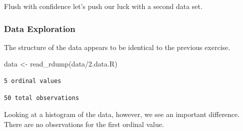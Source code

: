 \documentclass[
  letterpaper,
  DIV=11,
  numbers=noendperiod]{scrartcl}
\newenvironment{Shaded}{\begin{snugshade}}{\end{snugshade}}
\newcommand{\AttributeTok}[1]{\textcolor[rgb]{0.40,0.45,0.13}{#1}}
\newcommand{\DecValTok}[1]{\textcolor[rgb]{0.68,0.00,0.00}{#1}}
\newcommand{\FloatTok}[1]{\textcolor[rgb]{0.68,0.00,0.00}{#1}}
\newcommand{\FunctionTok}[1]{\textcolor[rgb]{0.28,0.35,0.67}{#1}}
\newcommand{\NormalTok}[1]{\textcolor[rgb]{0.00,0.23,0.31}{#1}}
\newcommand{\OtherTok}[1]{\textcolor[rgb]{0.00,0.23,0.31}{#1}}
\newcommand{\SpecialCharTok}[1]{\textcolor[rgb]{0.37,0.37,0.37}{#1}}
\newcommand{\StringTok}[1]{\textcolor[rgb]{0.13,0.47,0.30}{#1}}
\begin{document}
Flush with confidence let's push our luck with a second data set.

\subsubsection{Data Exploration}\label{data-exploration-1}

The structure of the data appears to be identical to the previous
exercise.

\begin{Shaded}
\begin{Highlighting}[]
\NormalTok{data }\OtherTok{\textless{}{-}} \FunctionTok{read\_rdump}\NormalTok{(}\StringTok{\textquotesingle{}data/2.data.R\textquotesingle{}}\NormalTok{)}
\end{Highlighting}
\end{Shaded}

\begin{Shaded}
\end{Shaded}

\begin{verbatim}
5 ordinal values
\end{verbatim}

\begin{Shaded}
\end{Shaded}

\begin{verbatim}
50 total observations
\end{verbatim}

Looking at a histogram of the data, however, we see an important
difference. There are no observations for the first ordinal value.

\begin{Shaded}
\end{Shaded}
\end{document}
